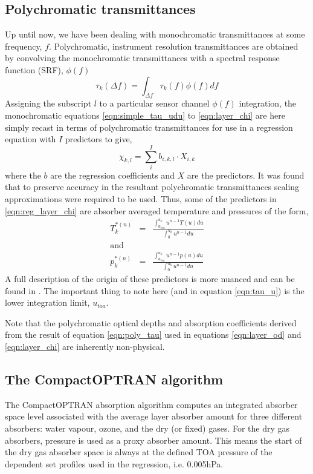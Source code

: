 \subsection{Polychromatic transmittances}
Up until now, we have been dealing with monochromatic transmittances at some frequency, $f$. Polychromatic, instrument resolution transmittances are obtained by convolving the monochromatic transmittances with a spectral response function (SRF), $\phi(f)$
\begin{equation}
  \tau_{k}(\Delta{f}) = \int_{\Delta{f}}\tau_{k}(f)\phi(f)df
  \label{eqn:poly_tau}
\end{equation}
Assigning the subscript $l$ to a particular sensor channel $\phi(f)$ integration, the monochromatic equations \ref{eqn:simple_tau_udu} to \ref{eqn:layer_chi} are here simply recast in terms of polychromatic transmittances for use in a regression equation with $I$ predictors to give,
\begin{equation}
  \chi_{k,l} = \sum_{i}^{I}b_{i,k,l}\cdot X_{i,k}
  \label{eqn:reg_layer_chi}
\end{equation}
where the $b$ are the regression coefficients and $X$ are the predictors. It was found\cite{OPTRAN1}\cite{OPTRAN3} that to preserve accuracy in the resultant polychromatic transmittances scaling approximations were required to be used. Thus, some of the predictors in \ref{eqn:reg_layer_chi} are absorber averaged temperature and pressures of the form,
\begin{eqnarray}
  T_{k}^{*(n)} & = & \frac{\displaystyle\int_{u_{toa}}^{u_{k}}u^{n-1}T(u)du}{\displaystyle\int_{0}^{u_{k}}u^{n-1}du}\nonumber\\
  \textrm{and} & &\\
  p_{k}^{*(n)} & = & \frac{\displaystyle\int_{u_{toa}}^{u_{k}}u^{n-1}p(u)du}{\displaystyle\int_{0}^{u_{k}}u^{n-1}du}\nonumber
\end{eqnarray}
A full description of the origin of these predictors is more nuanced and can be found in \cite{OPTRAN3}. The important thing to note here (and in equation \ref{eqn:tau_u}) is the lower integration limit, $u_{toa}$.

Note that the polychromatic optical depths and absorption coefficients derived from the result of equation \ref{eqn:poly_tau} used in equations \ref{eqn:layer_od} and \ref{eqn:layer_chi} are inherently non-physical.


\subsection{The CompactOPTRAN algorithm}
\label{sec:compact_optran}
The CompactOPTRAN absorption algorithm computes an integrated absorber space level associated with the average layer absorber amount for three different absorbers: water vapour, ozone, and the dry (or fixed) gases. For the dry gas absorbers, pressure is used as a proxy absorber amount. This means the start of the dry gas absorber space is always at the defined TOA pressure of the dependent set profiles used in the regression, i.e. 0.005hPa.

